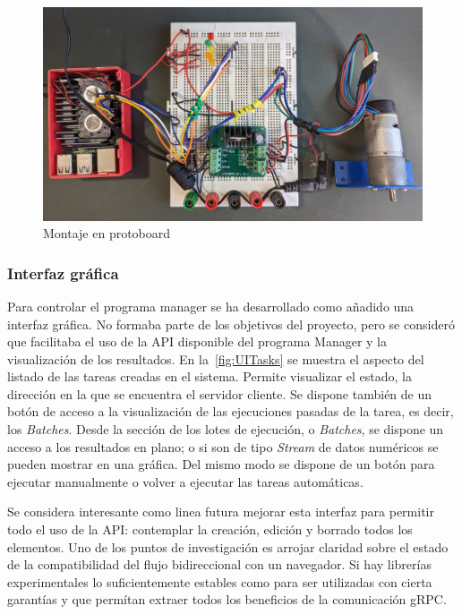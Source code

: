 \begin{figure}[H]
    \centering
    \includegraphics[height=0.35\textheight]{./part/Ejecucion/Seguimiento/PuestaAPunto/img/montajeProtoboard}
    \caption{Montaje en protoboard}\label{fig:montaje en protoboard}
\end{figure}

\subsubsection{Interfaz gráfica}

Para controlar el programa manager se ha desarrollado como añadido una interfaz gráfica.
No formaba parte de los objetivos del proyecto, pero se consideró que facilitaba el uso de la API disponible del programa Manager y la visualización de los resultados.
En la~\cref{fig:UITasks} se muestra el aspecto del listado de las tareas creadas en el sistema.
Permite visualizar el estado, la dirección en la que se encuentra el servidor cliente.
Se dispone también de un botón de acceso a la visualización de las ejecuciones pasadas de la tarea, es decir, los \textit{Batches}.
Desde la sección de los lotes de ejecución, o \textit{Batches}, se dispone un acceso a los resultados en plano;
o si son de tipo \textit{Stream} de datos numéricos se pueden mostrar en una gráfica.
Del mismo modo se dispone de un botón para ejecutar manualmente o volver a ejecutar las tareas automáticas.

Se considera interesante como linea futura mejorar esta interfaz para permitir todo el uso de la API: contemplar la creación, edición y borrado todos los elementos.
Uno de los puntos de investigación es arrojar claridad sobre el estado de la compatibilidad del flujo bidireccional con un navegador.
Si hay librerías experimentales lo suficientemente estables como para ser utilizadas con cierta garantías y que permítan extraer todos los beneficios de la comunicación gRPC\@.

